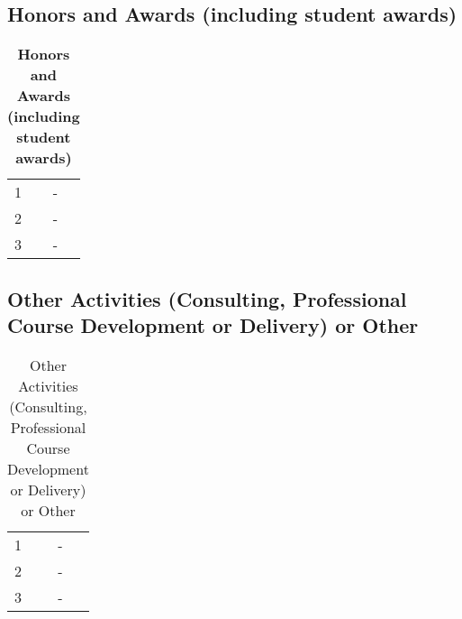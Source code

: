 \documentclass[11pt]{article}
\begin{document}

\subsection{Honors and Awards (including student awards)}
\begin{table}[h]
  \centering
  \caption{\textbf{Honors and Awards (including student awards)}\label{tab:honors-and-awards}}
  \begin{tabular}{ll}
    \toprule
    1& -\\
    2& -\\
    3& -\\
    \bottomrule
  \end{tabular}
\end{table}


\subsection{Other Activities (Consulting, Professional Course Development or Delivery) or Other}
\begin{table}[h]
  \centering
  \caption{Other Activities (Consulting, Professional Course Development or Delivery) or Other\label{tab:other-activities}}
  \begin{tabular}{ll}
    \toprule
    1& -\\
    2& -\\
    3& -\\
    \bottomrule
  \end{tabular}
\end{table}
\end{document}
